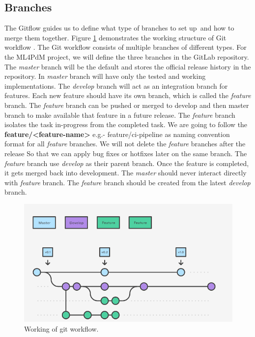 \subsection{Branches}
The Gitflow guides us to define what type of branches to set up and how to merge them together. Figure \ref{fig:git-workflow} demonstrates the working structure of Git workflow \cite{gitWorkflow}. The Git workflow consists of multiple branches of different types. For the ML4PdM project, we will define the three branches in the GitLab repository. The \textit{master} branch will be the default and stores the official release history in the repository. In \textit{master} branch will have only the tested and working implementations. The \textit{develop} branch will act as an integration branch for features. Each new feature should have its own branch, which is called the \textit{feature} branch. The \textit{feature} branch can be pushed or merged to develop and then master branch to make available that feature in a future release. The \textit{feature} branch isolates the task in-progress from the completed task. We are going to follow the \textbf{feature/<feature-name>} e.g.- feature/ci-pipeline as naming convention format for all \textit{feature} branches. We will not delete the \textit{feature} branches after the release So that we can apply bug fixes or hotfixes later on the same branch. The \textit{feature} branch use \textit{develop} as their parent branch. Once the feature is completed, it gets merged back into development. The \textit{master} should never interact directly with \textit{feature} branch. The \textit{feature} branch should be created from the latest \textit{develop} branch.
\begin{figure}[ht]
	\centering
	\includegraphics[width=\textwidth]{gfx/Git-Workflow.png}
	\captionsetup{justification=centering}
	\caption{Working of git workflow.}
	\label{fig:git-workflow}
\end{figure}

